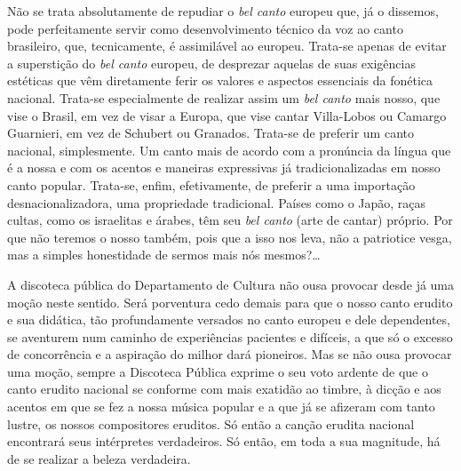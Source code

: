 Não se trata absolutamente de repudiar o \textit{bel canto} europeu que, já o
dissemos, pode perfeitamente servir como desenvolvimento técnico da voz
ao canto brasileiro, que, tecnicamente, é assimilável ao europeu.
Trata-se apenas de evitar a superstição do \textit{bel canto} europeu, de
desprezar aquelas de suas exigências estéticas que vêm diretamente ferir
os valores e aspectos essenciais da fonética nacional. Trata-se
especialmente de realizar assim um \textit{bel canto} mais nosso, que vise o
Brasil, em vez de visar a Europa, que vise cantar Villa-Lobos ou Camargo
Guarnieri, em vez de Schubert ou Granados. Trata-se de preferir um canto
nacional, simplesmente. Um canto mais de acordo com a pronúncia da
língua que é a nossa e com os acentos e maneiras expressivas já
tradicionalizadas em nosso canto popular. Trata-se, enfim, efetivamente,
de preferir a uma importação desnacionalizadora, uma propriedade
tradicional. Países como o Japão, raças cultas, como os israelitas e
árabes, têm seu \textit{bel canto} (arte de cantar) próprio. Por que não teremos
o nosso também, pois que a isso nos leva, não a patriotice vesga, mas a
simples honestidade de sermos mais nós mesmos?\ldots{}

A discoteca pública do Departamento de Cultura não ousa provocar desde
já uma moção neste sentido. Será porventura cedo demais para que o nosso
canto erudito e sua didática, tão profundamente versados no canto
europeu e dele dependentes, se aventurem num caminho de experiências
pacientes e difíceis, a que só o excesso de concorrência e a aspiração
do milhor dará pioneiros. Mas se não ousa provocar uma moção, sempre a
Discoteca Pública exprime o seu voto ardente de que o canto erudito
nacional se conforme com mais exatidão ao timbre, à dicção e aos acentos
em que se fez a nossa música popular e a que já se afizeram com tanto
lustre, os nossos compositores eruditos. Só então a canção erudita
nacional encontrará seus intérpretes verdadeiros. Só então, em toda a
sua magnitude, há de se realizar a beleza verdadeira.




